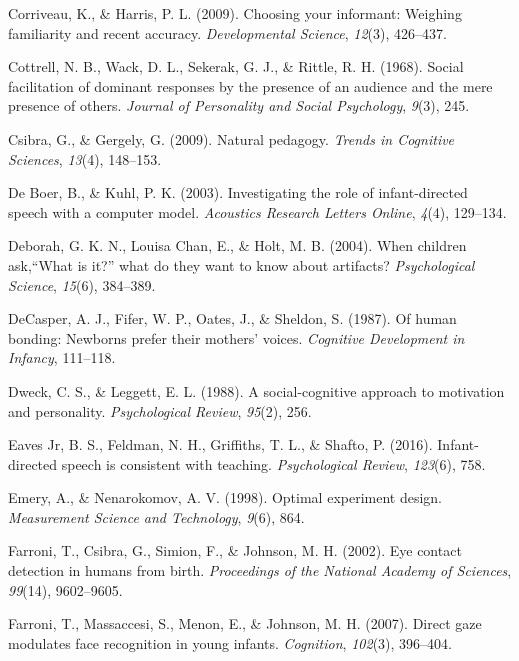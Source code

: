 \documentclass[oneside]{report}
\begin{document}
\hypertarget{ref-corriveau2009choosing}{}
Corriveau, K., \& Harris, P. L. (2009). Choosing your informant:
Weighing familiarity and recent accuracy. \emph{Developmental Science},
\emph{12}(3), 426--437.

\hypertarget{ref-cottrell1968social}{}
Cottrell, N. B., Wack, D. L., Sekerak, G. J., \& Rittle, R. H. (1968).
Social facilitation of dominant responses by the presence of an audience
and the mere presence of others. \emph{Journal of Personality and Social
Psychology}, \emph{9}(3), 245.

\hypertarget{ref-csibra2009natural}{}
Csibra, G., \& Gergely, G. (2009). Natural pedagogy. \emph{Trends in
Cognitive Sciences}, \emph{13}(4), 148--153.

\hypertarget{ref-de2003investigating}{}
De Boer, B., \& Kuhl, P. K. (2003). Investigating the role of
infant-directed speech with a computer model. \emph{Acoustics Research
Letters Online}, \emph{4}(4), 129--134.

\hypertarget{ref-deborah2004children}{}
Deborah, G. K. N., Louisa Chan, E., \& Holt, M. B. (2004). When children
ask,``What is it?'' what do they want to know about artifacts?
\emph{Psychological Science}, \emph{15}(6), 384--389.

\hypertarget{ref-decasper1987human}{}
DeCasper, A. J., Fifer, W. P., Oates, J., \& Sheldon, S. (1987). Of
human bonding: Newborns prefer their mothers' voices. \emph{Cognitive
Development in Infancy}, 111--118.

\hypertarget{ref-dweck1988social}{}
Dweck, C. S., \& Leggett, E. L. (1988). A social-cognitive approach to
motivation and personality. \emph{Psychological Review}, \emph{95}(2),
256.

\hypertarget{ref-eaves2016infant}{}
Eaves Jr, B. S., Feldman, N. H., Griffiths, T. L., \& Shafto, P. (2016).
Infant-directed speech is consistent with teaching. \emph{Psychological
Review}, \emph{123}(6), 758.

\hypertarget{ref-emery1998optimal}{}
Emery, A., \& Nenarokomov, A. V. (1998). Optimal experiment design.
\emph{Measurement Science and Technology}, \emph{9}(6), 864.

\hypertarget{ref-farroni2002eye}{}
Farroni, T., Csibra, G., Simion, F., \& Johnson, M. H. (2002). Eye
contact detection in humans from birth. \emph{Proceedings of the
National Academy of Sciences}, \emph{99}(14), 9602--9605.

\hypertarget{ref-farroni2007direct}{}
Farroni, T., Massaccesi, S., Menon, E., \& Johnson, M. H. (2007). Direct
gaze modulates face recognition in young infants. \emph{Cognition},
\emph{102}(3), 396--404.
\end{document}
